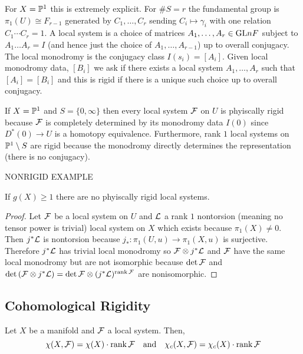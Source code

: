 \documentclass[12pt]{article}
\begin{document}
\begin{rmk}
For $X = \P^1$ this is extremely explicit. For $\# S = r$ the fundamental group is $\pi_1(U) \cong F_{r-1}$ generated by $C_1, \dots, C_r$ sending $C_i \mapsto \gamma_i$ with one relation $C_1 \cdots C_r = 1$. A local system is a choice of matrices $A_1, \dots, A_{r} \in \GL{n}{F}$ subject to $A_1 \dots A_r = I$ (and hence just the choice of $A_1, \dots, A_{r-1}$) up to overall conjugacy. The local monodromy is the conjugacy class $I(s_i) = [A_i]$. Given local monodromy data, $[B_i]$ we ask if there exists a local system $A_1, \dots, A_r$ such that $[A_i] = [B_i]$ and this is rigid if there is a unique such choice up to overall conjugacy.
\end{rmk}

\begin{rmk}
If $X = \P^1$ and $S = \{0, \infty\}$ then every local system $\F$ on $U$ is phyiscally rigid because $\F$ is completely determined by its monodromy data $I(0)$ since $D^*(0) \to U$ is a homotopy equivalence. Furthermore, rank $1$ local systems on $\P^1 \setminus S$ are rigid because the monodromy directly determines the representation (there is no conjugacy).
\end{rmk}

\begin{rmk}
NONRIGID EXAMPLE
\end{rmk}

\begin{prop}
If $g(X) \ge 1$ there are no phyiscally rigid local systems.
\end{prop}

\begin{proof}
Let $\F$ be a local system on $U$ and $\L$ a rank $1$ nontorsion (meaning no tensor power is trivial) local system on $X$ which exists because $\pi_1(X) \neq 0$. Then $j^* \L$ is nontorsion because $j_* : \pi_1(U, u) \to \pi_1(X, u)$ is surjective. Therefore $j^* \L$ has trivial local monodromy so $\F \ot j^* \L$ and $\F$ have the same local monodromy but are not isomorphic because $\det{\F}$ and $\det{(\F \ot j^* \L)} = \det{\F} \ot (j^* \L)^{\rank{\F}}$ are nonisomorphic. 
\end{proof}

\subsection{Cohomological Rigidity}

\begin{prop}
Let $X$ be a manifold and $\F$ a local system. Then,
\[ \chi(X, \F) = \chi(X) \cdot \rank{\F} \quad \text{and} \quad \chi_c(X, \F) = \chi_c(X) \cdot \rank{\F} \]
\end{prop}
\end{document}
